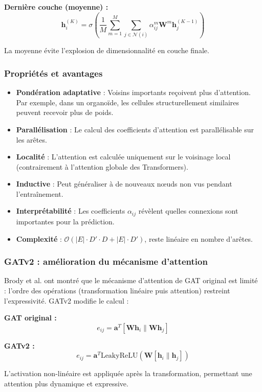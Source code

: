 \textbf{Dernière couche (moyenne) :}
\[
\mathbf{h}_i^{(K)} = \sigma\left(\frac{1}{M}\sum_{m=1}^M \sum_{j \in \mathcal{N}(i)} \alpha_{ij}^m \mathbf{W}^m\mathbf{h}_j^{(K-1)}\right)
\]

La moyenne évite l'explosion de dimensionnalité en couche finale.

\subsubsection{Propriétés et avantages}

\begin{itemize}
    \item \textbf{Pondération adaptative} : Voisins importants reçoivent plus d'attention. Par exemple, dans un organoïde, les cellules structurellement similaires peuvent recevoir plus de poids.
    \item \textbf{Parallélisation} : Le calcul des coefficients d'attention est parallélisable sur les arêtes.
    \item \textbf{Localité} : L'attention est calculée uniquement sur le voisinage local (contrairement à l'attention globale des Transformers).
    \item \textbf{Inductive} : Peut généraliser à de nouveaux nœuds non vus pendant l'entraînement.
    \item \textbf{Interprétabilité} : Les coefficients $\alpha_{ij}$ révèlent quelles connexions sont importantes pour la prédiction.
    \item \textbf{Complexité} : $\mathcal{O}(|E| \cdot D' \cdot D + |E| \cdot D')$, reste linéaire en nombre d'arêtes.
\end{itemize}

\subsubsection{GATv2 : amélioration du mécanisme d'attention}

Brody et al. ont montré que le mécanisme d'attention de GAT original est limité : l'ordre des opérations (transformation linéaire puis attention) restreint l'expressivité. GATv2 modifie le calcul :

\textbf{GAT original :}
\[
e_{ij} = \mathbf{a}^T [\mathbf{W}\mathbf{h}_i \| \mathbf{W}\mathbf{h}_j]
\]

\textbf{GATv2 :}
\[
e_{ij} = \mathbf{a}^T \text{LeakyReLU}\left(\mathbf{W}[\mathbf{h}_i \| \mathbf{h}_j]\right)
\]

L'activation non-linéaire est appliquée après la transformation, permettant une attention plus dynamique et expressive.

